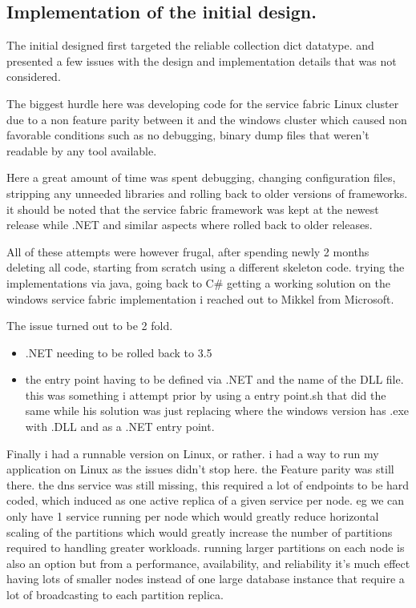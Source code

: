 \documentclass[a4paper,10pt,titlepage]{report}
\begin{document}
\subsection{Implementation of the initial design.}

The initial designed first targeted the reliable collection dict datatype. and presented a few issues with the design and implementation details that was not considered. 

The biggest hurdle here was developing code for the service fabric Linux cluster due to a non feature parity between it and the windows cluster which caused non favorable conditions such as no debugging, binary dump files that weren't readable by any tool available. 

Here a great amount of time was spent debugging, changing configuration files, stripping any unneeded libraries and rolling back to older versions of frameworks. it should be noted that the service fabric framework was kept at the newest release while .NET and similar aspects where rolled back to older releases.

All of these attempts were however frugal, after spending newly 2 months deleting all code, starting from scratch using a different skeleton code. trying the implementations via java, going back to C\# getting a working solution on the windows service fabric implementation i reached out to Mikkel from Microsoft. 

The issue turned out to be 2 fold.
\begin{itemize}
\item .NET needing to be rolled back to 3.5
\item the entry point having to be defined via .NET and the name of the DLL file. this was something i attempt prior by using a entry point.sh that did the same while his solution was just replacing where the windows version has .exe with .DLL and as a .NET entry point.
\end{itemize}

Finally i had a runnable version on Linux, or rather. i had a way to run my application on Linux as the issues didn't stop here. the Feature parity was still there. the dns service was still missing, this required a lot of endpoints to be hard coded, which induced as one active replica of a given service per node. eg we can only have 1 service running per node which would greatly reduce horizontal scaling of the partitions which would greatly increase the number of partitions required to handling greater workloads. running larger partitions on each node is also an option but from a performance, availability, and reliability it's much effect having lots of smaller nodes instead of one large database instance that require a lot of broadcasting to each partition replica.
\end{document}
